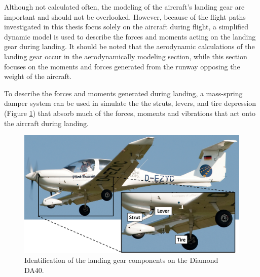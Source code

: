 \documentclass[../chapter_2.tex]{subfiles}
\begin{document}
Although not calculated often, the modeling of the aircraft's landing gear are important and should not be overlooked. However, because of the flight paths investigated in this thesis focus solely on the aircraft during flight, a simplified dynamic model is used to describe the forces and moments acting on the landing gear during landing. It should be noted that the aerodynamic calculations of the landing gear occur in the aerodynamically modeling section, while this section focuses on the moments and forces generated from the runway opposing the weight of the aircraft.

To describe the forces and moments generated during landing, a mass-spring damper system can be used in simulate the the struts, levers, and tire depression (Figure \ref{fig:ldg}) that absorb much of the forces, moments and vibrations that act onto the aircraft during landing.

\begin{figure}[!h]
        \centering
    \includegraphics[width=.75\linewidth]{../../Figures/LandingGear.png}
    \caption{Identification of the landing gear components on the Diamond DA40.}
    \label{fig:ldg}
\end{figure}
\end{document}
